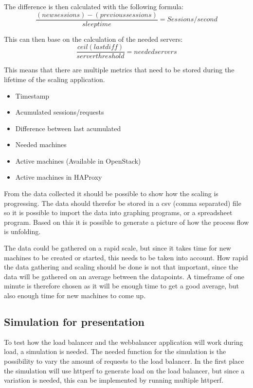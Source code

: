 The difference is then calculated with the following formula:
\begin{equation}
\frac{(newsessions) - (previoussessions)}{sleeptime} =
Sessions/second
\end{equation}

This can then base on the calculation of the needed servers:
\begin{equation}
\frac{ceil(lastdiff)}{server threshold} = needed servers
\end{equation}

This means that there are multiple metrics that need to be stored during the
lifetime of the scaling application.
\begin{itemize}
\item Timestamp
\item Acumulated sessions/requests
\item Difference between last acumulated
\item Needed machines
\item Active machines (Available in OpenStack)
\item Active machines in HAProxy
\end{itemize}

From the data collected it should be possible to show how the scaling is
progressing. The data should therefor be stored in a csv (comma separated)
file so it is possible to import the data into graphing programs, or a
spreadsheet program. Based on this it is possible to generate a picture of how
the process flow is unfolding.

The data could be gathered on a rapid scale, but since it takes time for new
machines to be created or started, this needs to be taken into account. How
rapid the data gathering and scaling should be done is not that important,
since the data will be gathered on an average between the datapoints. A
timeframe of one minute is therefore chosen as it will be enough time to get a
good average, but also enough time for new machines to come up.

\subsection{Simulation for presentation}
To test how the load balancer and the webbalancer application will work during
load, a simulation is needed. The needed function for the simulation is the
possibility to vary the amount of requests to the load balancer. In the first
place the simulation will use httperf to generate load on the load balancer,
but since a variation is needed, this can be implemented by running multiple
httperf.

